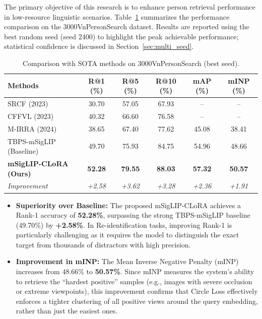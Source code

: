 \documentclass[../main.tex]{subfiles}
\begin{document}
\noindent The primary objective of this research is to enhance person retrieval performance in low-resource linguistic scenarios. Table~\ref{tab:comparison_3000vn} summarizes the performance comparison on the 3000VnPersonSearch dataset. Results are reported using the best random seed (seed 2400) to highlight the peak achievable performance; statistical confidence is discussed in Section~\ref{sec:multi_seed}.

\begin{table}[htbp]
\centering
\caption{Comparison with SOTA methods on 3000VnPersonSearch (best seed).}
\label{tab:comparison_3000vn}
\renewcommand{\arraystretch}{1.3}
\begin{tabularx}{\textwidth}{Xccccc}
\toprule
\textbf{Methods} & \textbf{R@1 (\%)} & \textbf{R@5 (\%)} & \textbf{R@10 (\%)} & \textbf{mAP (\%)} & \textbf{mINP (\%)} \\
\midrule
SRCF (2023) & 30.70 & 57.05 & 67.93 & -- & -- \\
CFFVL (2023) & 40.32 & 66.60 & 76.58 & -- & -- \\
M-IRRA (2024) & 38.65 & 67.40 & 77.62 & 45.08 & 38.41 \\
TBPS-mSigLIP (Baseline) & 49.70 & 75.93 & 84.75 & 54.96 & 48.66 \\
\textbf{mSigLIP-CLoRA (Ours)} & \textbf{52.28} & \textbf{79.55} & \textbf{88.03} & \textbf{57.32} & \textbf{50.57} \\
\midrule
\textit{Improvement} & \textit{+2.58} & \textit{+3.62} & \textit{+3.28} & \textit{+2.36} & \textit{+1.91} \\
\bottomrule
\end{tabularx}
\end{table}

\begin{itemize}
    \item \textbf{Superiority over Baseline:} The proposed mSigLIP-CLoRA achieves a Rank-1 accuracy of \textbf{52.28\%}, surpassing the strong TBPS-mSigLIP baseline (49.70\%) by \textbf{+2.58\%}. In Re-identification tasks, improving Rank-1 is particularly challenging as it requires the model to distinguish the exact target from thousands of distractors with high precision.
    \item \textbf{Improvement in mINP:} The Mean Inverse Negative Penalty (mINP) increases from 48.66\% to \textbf{50.57\%}. Since mINP measures the system's ability to retrieve the ``hardest positive'' samples (e.g., images with severe occlusion or extreme viewpoints), this improvement confirms that Circle Loss effectively enforces a tighter clustering of all positive views around the query embedding, rather than just the easiest ones.
\end{itemize}
\end{document}
